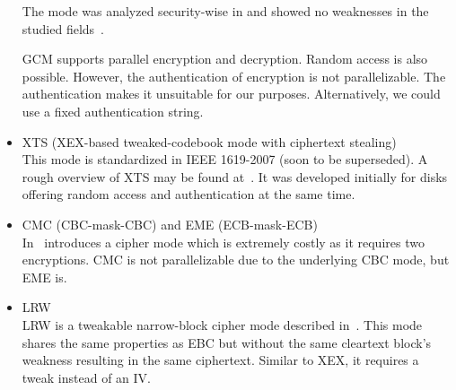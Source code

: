 \begin{itemize}
	The mode was analyzed security-wise in \citeyear{mcgrew2004security} and showed no weaknesses in the studied fields~\cite{mcgrew2004security}. 
	
	GCM supports parallel encryption and decryption. Random access is also possible. However, the authentication of encryption is not parallelizable. The authentication makes it unsuitable for our purposes. Alternatively, we could use a fixed authentication string.
	\item XTS (XEX-based tweaked-codebook mode with ciphertext stealing)\\
	This mode is standardized in IEEE 1619-2007 (soon to be superseded). A rough overview of XTS may be found at~\cite{Martin2010}. It was developed initially for disks offering random access and authentication at the same time. 
	\item CMC (CBC-mask-CBC) and EME (ECB-mask-ECB)\\ 
	In~\cite{Halevi:2003} \citeauthor{Halevi:2003} introduces a cipher mode which is extremely costly as it requires two encryptions. CMC is not parallelizable due to the underlying CBC mode, but EME is. 
	\item LRW\\
	LRW is a tweakable narrow-block cipher mode described in~\cite{tschorsch:translayeranon}. This mode shares the same properties as EBC but without the same cleartext block's weakness resulting in the same ciphertext. Similar to XEX, it requires a tweak instead of an IV.
\end{itemize}

